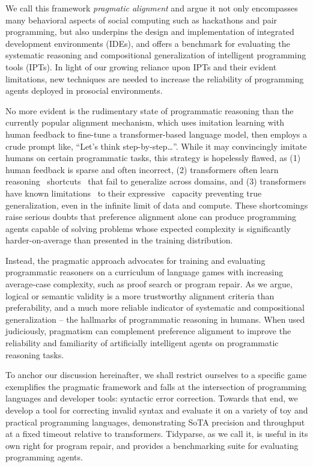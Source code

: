\documentclass[sigplan,screen]{acmart}
\begin{document}
We call this framework \emph{pragmatic alignment} and argue it not only encompasses many behavioral aspects of social computing such as hackathons and pair programming, but also underpins the design and implementation of integrated development environments (IDEs), and offers a benchmark for evaluating the systematic reasoning and compositional generalization of intelligent programming tools (IPTs). In light of our growing reliance upon IPTs and their evident limitations, new techniques are needed to increase the reliability of programming agents deployed in prosocial environments.

No more evident is the rudimentary state of programmatic reasoning than the currently popular alignment mechanism, which uses imitation learning with human feedback to fine-tune a transformer-based language model, then employs a crude prompt like, ``Let's think step-by-step\ldots''. While it may convincingly imitate humans on certain programmatic tasks, this strategy is hopelessly flawed, as (1) human feedback is sparse and often incorrect, (2) transformers often learn reasoning~\cite{dziri2023faith} shortcuts~\cite{liu2022transformers} that fail to generalize across domains, and (3) transformers have known limitations~\cite{merrill2022saturated} to their expressive~\cite{chiang2023tighter} capacity preventing true generalization, even in the infinite limit of data and compute. These shortcomings raise serious doubts that preference alignment alone can produce programming agents capable of solving problems whose expected complexity is significantly harder-on-average than presented in the training distribution.

Instead, the pragmatic approach advocates for training and evaluating programmatic reasoners on a curriculum of language games with increasing average-case complexity, such as proof search or program repair. As we argue, logical or semantic validity is a more trustworthy alignment criteria than preferability, and a much more reliable indicator of systematic and compositional generalization -- the hallmarks of programmatic reasoning in humans. When used judiciously, pragmatism can complement preference alignment to improve the reliability and familiarity of artificially intelligent agents on programmatic reasoning tasks.

To anchor our discussion hereinafter, we shall restrict ourselves to a specific game exemplifies the pragmatic framework and falls at the intersection of programming languages and developer tools: syntactic error correction. Towards that end, we develop a tool for correcting invalid syntax and evaluate it on a variety of toy and practical programming languages, demonstrating SoTA precision and throughput at a fixed timeout relative to transformers. Tidyparse, as we call it, is useful in its own right for program repair, and provides a benchmarking suite for evaluating programming agents.
\end{document}
